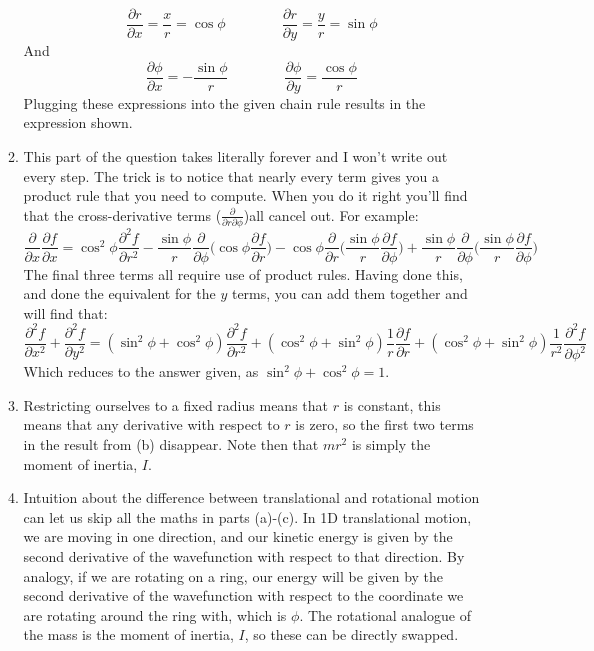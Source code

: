 \documentclass{memoir}[11pt,oneside,a4paper,openany]
\begin{document}
\begin{enumerate}
\begin{enumerate}
				\begin{equation}
					\frac{\partial r}{\partial x} = \frac{x}{r} = \cos\phi \qquad \qquad \frac{\partial r}{\partial y} = \frac{y}{r} = \sin\phi 
				\end{equation}
				And
				\begin{equation}
					\frac{\partial \phi}{\partial x} = -\frac{\sin\phi}{r} \qquad \qquad \frac{\partial \phi}{\partial y} = \frac{\cos \phi}{r}
				\end{equation}
			Plugging these expressions into the given chain rule results in the expression shown.
			\item This part of the question takes literally forever and I won't write out every step. The trick is to notice that nearly every term gives you a product rule that you need to compute. When you do it right you'll find that the cross-derivative terms ($\frac{\partial}{\partial r \partial \phi}$)all cancel out. For example:
				\begin{equation}
					\frac{\partial}{\partial x}\frac{\partial f}{\partial x} = \cos^2\phi \frac{\partial^2f}{\partial r^2} - \frac{\sin\phi}{r}\frac{\partial}{\partial\phi}\bigg(\cos\phi\frac{\partial f}{\partial r}\bigg) - \cos\phi\frac{\partial}{\partial r}\bigg(\frac{\sin\phi}{r}\frac{\partial f}{\partial\phi}\bigg) + \frac{\sin\phi}{r}\frac{\partial}{\partial\phi}\bigg(\frac{\sin\phi}{r}\frac{\partial f}{\partial\phi}\bigg) 
				\end{equation}
		The final three terms all require use of product rules. Having done this, and done the equivalent for the $y$ terms, you can add them together and will find that:
				\begin{equation} 
					\frac{\partial^2f}{\partial x^2} + \frac{\partial^2f}{\partial y^2} = (\sin^2\phi + \cos^2\phi)\frac{\partial^2f}{\partial r^2} + (\cos^2\phi+\sin^2\phi)\frac{1}{r}\frac{\partial f}{\partial r} + (\cos^2\phi + \sin^2\phi)\frac{1}{r^2}\frac{\partial^2f}{\partial\phi^2}
				\end{equation}
				Which reduces to the answer given, as $\sin^2\phi + \cos^2\phi = 1$. 
			\item Restricting ourselves to a fixed radius means that $r$ is  constant, this means that any derivative with respect to $r$ is zero, so the first two terms in the result from (b) disappear. Note then that $mr^2$ is simply the moment of inertia, $I$. 
			\item Intuition about the difference between translational and rotational motion can let us skip all the maths in parts (a)-(c). In 1D translational motion, we are moving in one direction, and our kinetic energy is given by the second derivative of the wavefunction with respect to that direction. By analogy, if we are rotating on a ring, our energy will be given by the second derivative of the wavefunction with respect to the coordinate we are rotating around the ring with, which is $\phi$. The rotational analogue of the mass is the moment of inertia, $I$, so these can be directly swapped. 
		\end{enumerate}	
		\end{enumerate}
\end{document}

